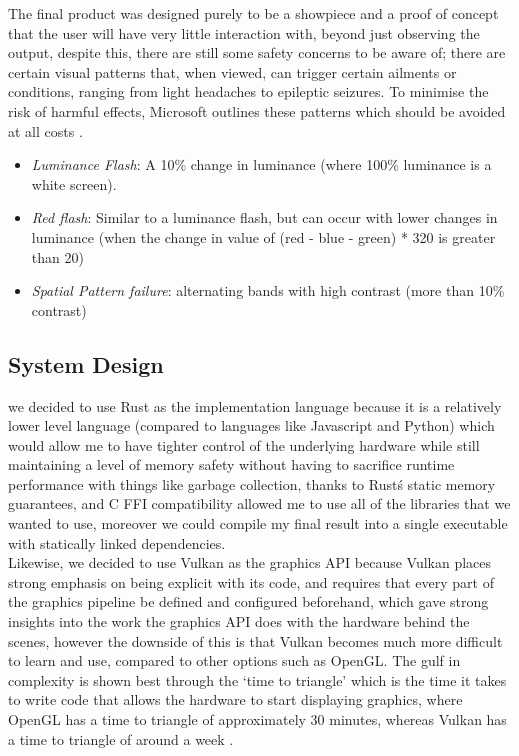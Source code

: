 \documentclass[../report.tex]{subfiles}
\begin{document}
The final product was designed purely to be a showpiece and a proof of concept that the user will have very little interaction with, beyond just observing the output, despite this, there are 
still some safety concerns to be aware of; there are certain visual patterns that, when viewed, can trigger certain ailments or conditions, ranging from light headaches to epileptic seizures.
To minimise the risk of harmful effects, Microsoft outlines these patterns which should be avoided at all costs .

\begin{itemize}
    \item{\emph{Luminance Flash}: A 10\% change in luminance (where 100\% luminance is a white screen). }
    \item{\emph{Red flash}: Similar to a luminance flash, but can occur with lower changes in luminance (when the change in value of (red - blue - green) * 320 is greater than 20)}
    \item{\emph{Spatial Pattern failure}: alternating bands with high contrast (more than 10\% contrast)}
\end{itemize}



\subsection{System Design}
we decided to use Rust as the implementation language because it is a relatively lower level language (compared to languages like Javascript and Python)
which would allow me to have tighter control of the underlying hardware while still maintaining a level of memory safety without having to sacrifice runtime performance with things like garbage collection, thanks to Rust\'s static memory guarantees, and C FFI compatibility allowed me to use all of the libraries that we wanted to use, moreover we could compile my final result into a single executable with statically linked dependencies. \\

Likewise, we decided to use Vulkan as the graphics API because Vulkan places strong emphasis on being explicit with its code, and requires that every part of the graphics pipeline be defined and configured beforehand, which gave strong insights into the work the graphics API does with the hardware behind the scenes, however the downside of this is that Vulkan becomes much more difficult to learn and use, compared to other options such as OpenGL.
The gulf in complexity is shown best through the `time to triangle' which is the time it takes to write code that allows the hardware to start displaying graphics, where OpenGL has a time to triangle of approximately 30 minutes, whereas Vulkan has a time to triangle of around a week .
\end{document}
